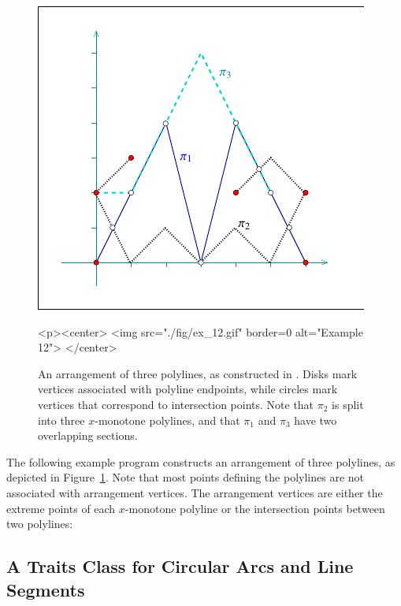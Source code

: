 \begin{figure}[t]
\begin{ccTexOnly}
  \begin{center}
  \includegraphics{Arrangement_on_surface_2/fig/ex_12}
  \end{center}
\end{ccTexOnly}
\begin{ccHtmlOnly}
  <p><center>
  <img src="./fig/ex_12.gif" border=0 alt="Example 12">
  </center>
\end{ccHtmlOnly}
\caption{An arrangement of three polylines, as constructed in
. Disks mark vertices associated with
polyline endpoints, while circles mark vertices that correspond
to intersection points. Note that $\pi_2$ is split into three
$x$-monotone polylines, and that $\pi_1$ and $\pi_3$ have two
overlapping sections.\label{arr_fig:ex_12}}
\end{figure}

The following example program constructs an arrangement of three
polylines, as depicted in Figure~\ref{arr_fig:ex_12}. Note that
most points defining the polylines are not associated with arrangement
vertices. The arrangement vertices are either the extreme points of
each $x$-monotone polyline or the intersection points between two
polylines:


\subsection{A Traits Class for Circular Arcs and Line Segments
  \label{arr_ssec:tr_circ_seg}}

